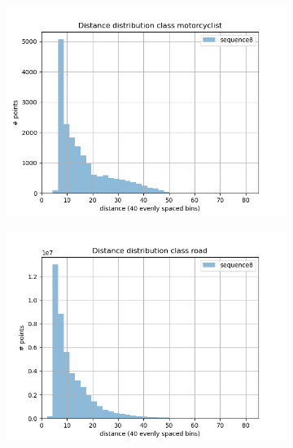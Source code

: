 \begin{figure}[h]
\begin{subfigure}[b]{0.24\textwidth}
         \includegraphics[width=\textwidth]{Figures/Chapter4/dist-height/dist/test/class8.png}
     \end{subfigure}
     \hfill
     \begin{subfigure}[b]{0.24\textwidth}
         \centering
         \includegraphics[width=\textwidth]{Figures/Chapter4/dist-height/dist/test/class9.png}
     \end{subfigure}
     \begin{subfigure}[b]{0.24\textwidth}
         \centering

\end{subfigure}
\end{figure}
